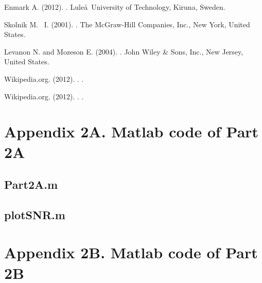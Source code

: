 \documentclass{article}
\begin{document}
\begin{thebibliography}{9}

Enmark A.  (2012).
.
\newblock Lule\aa \ University of Technology, Kiruna, Sweden.

Skolnik M. ~I.  (2001).
.
\newblock The McGraw-Hill Companies, Inc., New York, United States.

Levanon N. and Mozeson E. (2004).
.
\newblock John Wiley \& Sons, Inc., New Jersey, United States.

Wikipedia.org. (2012).
.
.

Wikipedia.org. (2012).
.
.

\end{thebibliography}




\section{Appendix 2A. Matlab code of Part 2A}

\subsection{Part2A.m}


\subsection{plotSNR.m}



\section{Appendix 2B. Matlab code of Part 2B}
\end{document}
